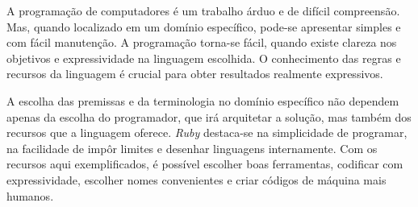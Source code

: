\documentclass[espaco=simples,appendix=Name]{abnt}
\begin{document}
A programação de computadores é um trabalho árduo e de difícil compreensão. Mas, quando localizado em um domínio específico, pode-se apresentar simples e com fácil manutenção. A programação torna-se fácil, quando existe clareza nos objetivos e expressividade na linguagem escolhida. O conhecimento das regras e recursos da linguagem é crucial para obter resultados realmente expressivos. 

A escolha das premissas e da terminologia no domínio específico não dependem apenas da escolha do programador, que irá arquitetar a solução, mas também dos recursos que a linguagem oferece. \textit{Ruby} destaca-se na simplicidade de programar, na facilidade de impôr limites e desenhar linguagens internamente. Com os recursos aqui exemplificados, é possível escolher boas ferramentas, codificar com expressividade, escolher nomes convenientes e criar códigos de máquina mais humanos.
\end{document}
